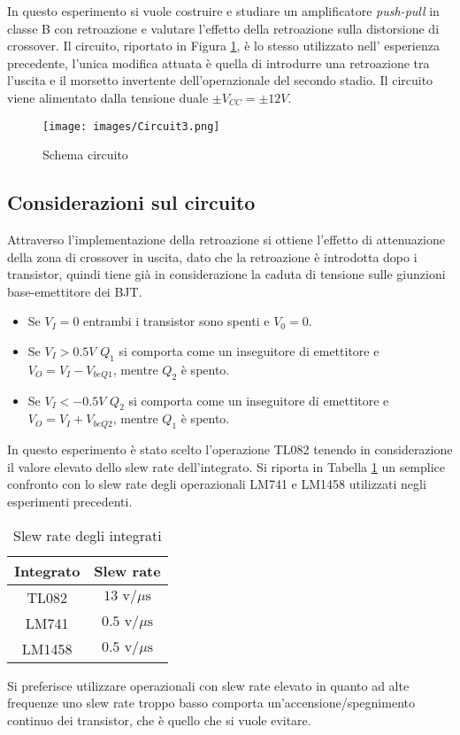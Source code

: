 In questo esperimento si vuole costruire e studiare un amplificatore \textit{push-pull} in classe B con retroazione e valutare l'effetto della retroazione sulla distorsione di crossover. Il circuito, riportato in Figura \ref{fig:Circuito3}, è lo stesso utilizzato nell' esperienza precedente, l'unica modifica attuata è quella di introdurre una retroazione tra l'uscita e il morsetto invertente dell'operazionale del secondo stadio. Il circuito viene alimentato dalla tensione duale $\pm V_{CC}=\pm 12V$.
\begin{figure}[H]
    \centering
    \texttt{[image: images/Circuit3.png]}
    \caption{Schema circuito}
    \label{fig:Circuito3}
\end{figure}
\subsection{Considerazioni sul circuito}
Attraverso l’implementazione della retroazione si ottiene l’effetto di attenuazione della zona di crossover in uscita, dato che la retroazione è introdotta dopo i transistor, quindi tiene già in considerazione la caduta di tensione sulle giunzioni base-emettitore dei BJT.
\begin{itemize}
    \item Se $V_I=0$ entrambi i transistor sono spenti e $V_0=0$.
    \item Se $V_I > 0.5 V$ $Q_1$ si comporta come un inseguitore di emettitore e $V_O = V_I - V_{beQ1}$, mentre $Q_2$ è spento. 
    \item Se $V_I < -0.5V$ $Q_2$ si comporta come un inseguitore di emettitore e $V_O = V_I + V_{beQ2}$, mentre $Q_1$ è spento.
\end{itemize}
\noindent In questo esperimento è stato scelto l'operazione TL082 tenendo in considerazione il valore elevato dello slew rate dell'integrato. Si riporta in Tabella \ref{tab:slewrate} un semplice confronto con lo slew rate degli operazionali LM741 e LM1458 utilizzati negli esperimenti precedenti.
\begin{table}[H]
    \centering
    \begin{tabular}{|c|c|}
        \hline
        Integrato&Slew rate\\\hline
        TL082&$13\text{ v/}\mu\text{s}$\\\hline
        LM741&$0.5\text{ v/}\mu\text{s}$\\\hline
        LM1458&$0.5\text{ v/}\mu\text{s}$\\\hline
    \end{tabular}
    \caption{Slew rate degli integrati}
    \label{tab:slewrate}
\end{table}
Si preferisce utilizzare operazionali con slew rate elevato in quanto ad alte frequenze uno slew rate troppo basso comporta un'accensione/spegnimento continuo dei transistor, che è quello che si vuole evitare.
